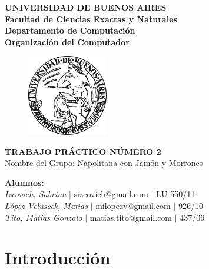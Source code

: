 \documentclass[10pt, a4paper]{article}
\begin{document}
\thispagestyle{empty}
\begin{center}

\Huge{ \bf{UNIVERSIDAD DE BUENOS AIRES}}
\\
\LARGE{\bf{Facultad de Ciencias Exactas y Naturales}}
\\
\textbf{Departamento de Computaci\'on}
\\
\textbf{Organizaci\'on del Computador}
\vspace{2.0\baselineskip}
\end{center}


\begin{figure}[h] %
\begin{center}
\includegraphics[width=100pt]{./image.jpeg}
\end{center}
\end{figure}
\begin{center}
\vspace*{0.7cm}

\huge{\bf TRABAJO PR\'ACTICO N\'UMERO 2}\\
\huge{Nombre del Grupo: Napolitana con Jam\'on y Morrones}
\vspace*{9cm}

\end{center}

\huge{\textbf{Alumnos:}}\\
\Large{\textsl{Izcovich, Sabrina} $|$ sizcovich@gmail.com $|$ LU 550/11}\\
\Large{\textsl{L\'opez Veluscek, Matías} \hspace{0.1cm}$|$ milopezv@gmail.com $|$ 926/10}\\
\Large{\textsl{Tito, Matías Gonzalo} \hspace{0.37cm}$|$ matias.tito@gmail.com $|$ 437/06}
\vspace{0.6cm}
 
\newpage
\thispagestyle{empty}
\large{
\tableofcontents
}
\newpage
\section{Introducci\'on}
\end{document}
